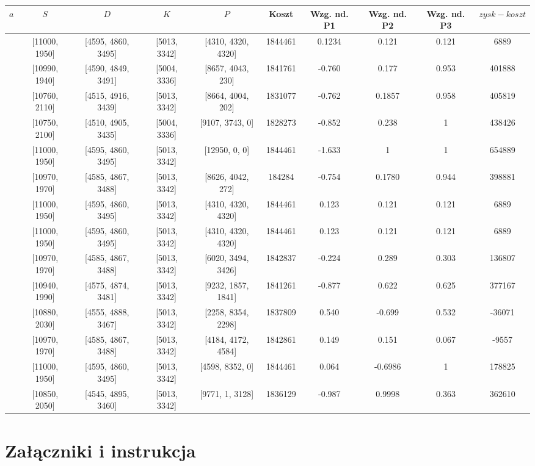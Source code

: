 \documentclass[a4paper, 10pt]{article}
\begin{document}
\begin{landscape}
\begin{center}
\begin{tabular}{ | l | c | c | c | c | c | c | c | c |c |}
    $a$ & $S$ & $D$ & $K$ & $P$ & Koszt & Wzg. nd. P1  & Wzg. nd. P2 & Wzg. nd. P3 & $zysk-koszt$ \\ \hline	 
	 [1844460, 1, 1, 1] &  [11000, 1950] & [4595, 4860, 3495] & [5013, 3342] & [4310, 4320, 4320] & 1844461 & 0.1234  & 0.121  & 0.121  & 6889 \\  \hline
	 [0, -1.633, -0.699, 0.065] &  [10990, 1940] & [4590, 4849, 3491] & [5004, 3336] & [8657, 4043, 230] & 1841761 & -0.760  & 0.177  & 0.953  & 401888 \\  \hline
	 [1800000, -1.633, -0.699, 0.065] &  [10760, 2110] & [4515, 4916, 3439] & [5013, 3342] & [8664, 4004, 202] & 1831077 & -0.762  & 0.1857  & 0.958  & 405819 \\  \hline
	 [1800000, -2, -0.699, 0.065] &  [10750, 2100] & [4510, 4905, 3435] & [5004, 3336] & [9107, 3743, 0] & 1828273 & -0.852  & 0.238  & 1  & 438426 \\  \hline
	 [1800000, -3, -0.699, 0.065] &  [11000, 1950] & [4595, 4860, 3495] & [5013, 3342] & [12950, 0, 0] & 1844461 & -1.633  & 1  & 1  & 654889 \\  \hline
	 [1500000, -1.633, -0.699, 0.065] &  [10970, 1970] & [4585, 4867, 3488] & [5013, 3342] & [8626, 4042, 272] & 184284 & -0.754  & 0.1780  & 0.944  & 398881 \\  \hline
	 [1500000, -1, -1, -1] &  [11000, 1950] & [4595, 4860, 3495] & [5013, 3342] & [4310, 4320, 4320] & 1844461 & 0.123  & 0.121  & 0.121  & 6889\\ \hline
	 [1800000, 0, 0, 0] &  [11000, 1950] & [4595, 4860, 3495] & [5013, 3342] & [4310, 4320, 4320] & 1844461 & 0.123  & 0.121  & 0.121  & 6889 \\ \hline
	 [1800000, 0, 0.5, 0.5] &  [10970, 1970] & [4585, 4867, 3488] & [5013, 3342] & [6020, 3494, 3426] & 1842837 & -0.224  & 0.289  & 0.303  & 136807 \\ \hline
	 [1000000, -1, 0.5, 0.5] &  [10940, 1990] & [4575, 4874, 3481] & [5013, 3342] & [9232, 1857, 1841] & 1841261 & -0.877  & 0.622  & 0.625  & 377167 \\ \hline
	 [1000000, 0.5, -1, 0.5] &  [10880, 2030] & [4555, 4888, 3467] & [5013, 3342] & [2258, 8354, 2298] & 1837809 & 0.540  & -0.699  & 0.532  & -36071 \\ \hline
	 [1000000, 0.5, 0.5, -1] &  [10970, 1970] & [4585, 4867, 3488] & [5013, 3342] & [4184, 4172, 4584] & 1842861 & 0.149  & 0.151  & 0.067  & -9557\\ \hline
	 [1000000, -1, -1, 1] &  [11000, 1950] & [4595, 4860, 3495] & [5013, 3342] & [4598, 8352, 0] & 1844461 & 0.064  & -0.6986  & 1  & 178825 \\ \hline
	 [1000000, -2, 0, -1] &  [10850, 2050] & [4545, 4895, 3460] & [5013, 3342] & [9771, 1, 3128] & 1836129 & -0.987  & 0.9998  & 0.363 & 362610 \\ \hline
	 
	 
    \end{tabular}
\end{center}




\end{landscape}
\section{Załączniki i instrukcja}
\end{document}
